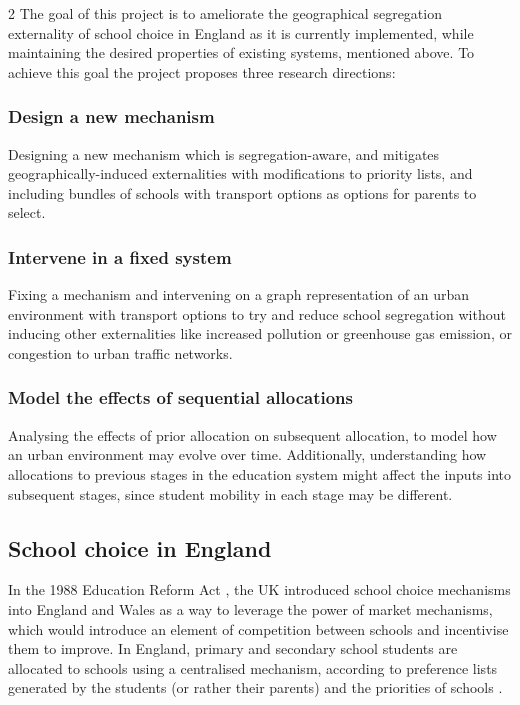 \documentclass{article}
\begin{document}
\begin{multicols}{2}
The goal of this project is to ameliorate the geographical segregation externality of school choice in England as it is currently implemented, while maintaining the desired properties of existing systems, mentioned above. To achieve this goal the project proposes three research directions:

\subsubsection{Design a new mechanism}
Designing a new mechanism which is segregation-aware, and mitigates geographically-induced externalities with modifications to priority lists, and including bundles of schools with transport options as options for parents to select.
\subsubsection{Intervene in a fixed system}
Fixing a mechanism and intervening on a graph representation of an urban environment with transport options to try and reduce school segregation without inducing other externalities like increased pollution or greenhouse gas emission, or congestion to urban traffic networks.
\subsubsection{Model the effects of sequential allocations}
Analysing the effects of prior allocation on subsequent allocation, to model how an urban environment may evolve over time. Additionally, understanding how allocations to previous stages in the education system might affect the inputs into subsequent stages, since student mobility in each stage may be different.

\subsection{School choice in England}
In the 1988 Education Reform Act \cite{participationEducationReformAct}, the UK introduced school choice mechanisms into England and Wales as a way to leverage the power of market mechanisms, which would introduce an element of competition between schools and incentivise them to improve. In England, primary and secondary school students are allocated to schools using a centralised mechanism, according to preference lists generated by the students (or rather their parents) and the priorities of schools \cite{westSchoolChoiceDiversity2023}.


\end{multicols}
\end{document}

